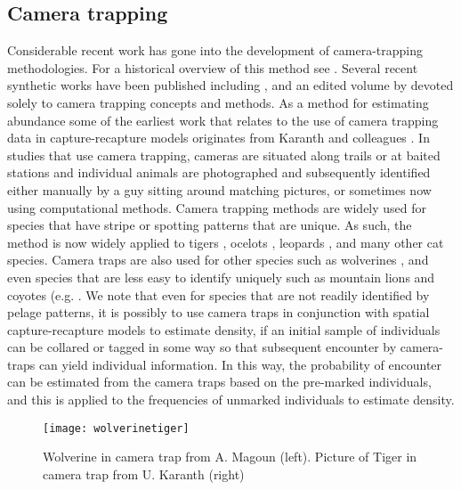 \subsection{Camera trapping}

Considerable recent work has gone into the development of
camera-trapping methodologies. For a historical overview of this
method see \citet{kays_etal:2008, kucera_barrett:2011}.  Several
recent synthetic works have been published including
\citet{nichols_karanth:2002}, and an edited volume by
\citet{oconnell_etal:2010} devoted solely to camera trapping concepts
and methods. As a method for estimating abundance some of the earliest
work that relates to the use of camera trapping data in
capture-recapture models originates from Karanth and colleagues
\citep{karanth:1995, karanth_nichols:1998, karanth_nichols:2000}. In
studies that use camera trapping, cameras are situated along trails or
at baited stations and individual animals are photographed and
subsequently identified either manually by a guy sitting around
matching pictures, or sometimes now using computational
methods. Camera trapping methods are widely used for species that have
stripe or spotting patterns that are unique. As such, the method is
now widely applied to tigers \citep{karanth:1995,
  karanth_nichols:1998}, ocelots
\citep{trolle_kery:2003,trolle_kery:2005}, leopards
\citep{balme_etal:2010}, and many other cat species. Camera traps are
also used for other species such as wolverines
\citep{magoun_etal:2011}, and even species that are less easy to
identify uniquely such as mountain lions and coyotes
(e.g. \citet{kelly_etal:2008}.  We note that even for species that are
not readily identified by pelage patterns, it is possibly to use
camera traps in conjunction with spatial capture-recapture models to
estimate density, if an initial sample of individuals can be collared
or tagged in some way so that subsequent encounter by camera-traps can
yield individual information. In this way, the probability of
encounter can be estimated from the camera traps based on the
pre-marked individuals, and this is applied to the frequencies of
unmarked individuals to estimate density.


\begin{figure}
\begin{center}
\texttt{[image: wolverinetiger]}
\end{center}
\caption{Wolverine in camera trap from A. Magoun (left). Picture of Tiger in
  camera trap from U. Karanth (right)}
\label{fig.wolverinetiger}
\end{figure}

